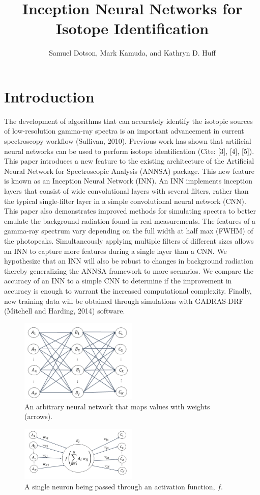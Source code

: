 \documentclass{anstrans}
\title{Inception Neural Networks for Isotope Identification}
\author{Samuel Dotson, Mark Kamuda, and Kathryn D. Huff}
\institute{
Dept. of Nuclear, Plasma and Radiological Engineering, University of Illinois at Urbana-Champaign \\
sgd2@illinois.edu
}
\begin{document}

\section{Introduction}
The development of algorithms that can accurately identify the isotopic sources of low-resolution gamma-ray 
spectra is an important advancement in  current spectroscopy workflow (Sullivan, 2010).
Previous work has shown that artificial neural networks can be used to perform isotope identification (Cite: [3], [4], [5]). This paper introduces a new feature to the existing architecture of the Artificial Neural Network for Spectroscopic Analysis (ANNSA) package. This new feature is known as an Inception Neural Network (INN). An INN implements inception layers that consist of wide convolutional layers with several filters, rather than the typical single-filter layer in a simple convolutional neural network (CNN).
This paper also demonstrates improved methods for simulating spectra to better emulate the background radiation found in real measurements. 
The features of a gamma-ray spectrum vary depending on the full width at half max (FWHM) of the photopeaks. 
Simultaneously applying multiple filters of different sizes allows an INN to capture more features during a single layer than a CNN. 
We hypothesize that an INN will also be robust to changes in background radiation thereby generalizing the ANNSA framework to more scenarios. 
We compare the accuracy of an INN to a simple CNN to determine if the improvement in accuracy is enough to warrant the increased computational complexity. 
Finally, new training data will be obtained through simulations with GADRAS-DRF (Mitchell and Harding, 2014) software.


\begin{figure}[h]
\centering
\includegraphics[width=0.5\textwidth]{dense-layer-figure.png}
\caption{An arbitrary neural network that maps values with weights (arrows).}
\label{fig:dense-nn}
\end{figure}
\begin{figure}[h]
\centering
\includegraphics[width=0.5\textwidth]{neuron-figure.png}
\caption{A single neuron being passed through an activation function, $\textit{f}$.}
\label{fig:neuron}
\end{figure}
\end{document}
